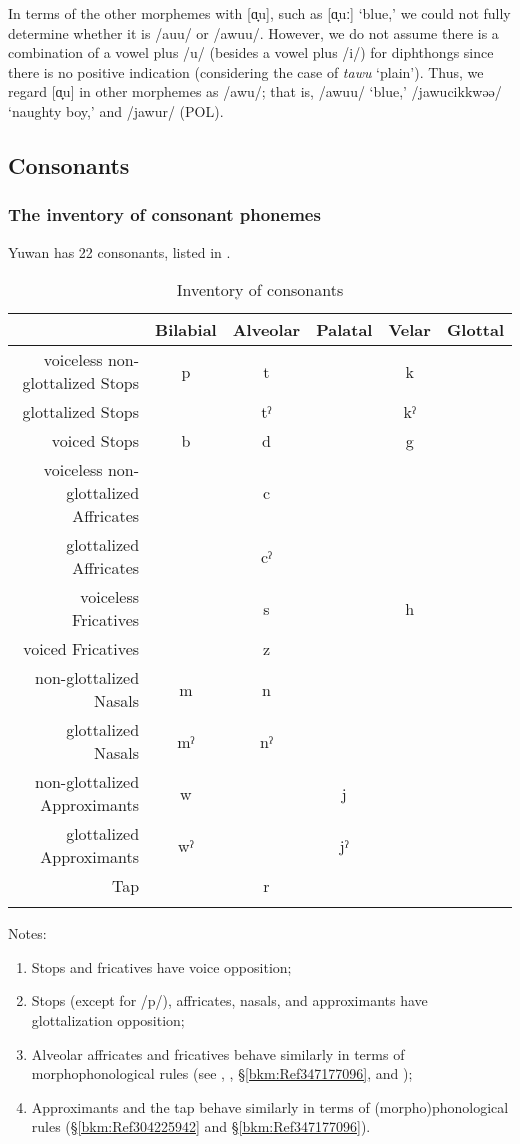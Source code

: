 In terms of the other morphemes with [ɑ̟u], such as [ɑ̟uː] ‘blue,’ we could not fully determine whether it is /auu/ or /awuu/. However, we do not assume there is a combination of a vowel plus /u/ (besides a vowel plus /i/) for diphthongs since there is no positive indication (considering the case of \textit{tawu} ‘plain’). Thus, we regard [ɑ̟u] in other morphemes as /awu/; that is, /awuu/ ‘blue,’ /jawucikkwəə/ ‘naughty boy,’ and /jawur/ (POL).

\subsection{Consonants}
\subsubsection{The inventory of consonant phonemes}

Yuwan has 22 consonants, listed in .

\begin{table}
\caption{Inventory of consonants\label{tab:2:8}}
\begin{tabular}{rccccc}
\lsptoprule
     & Bilabial &  Alveolar &  Palatal &  Velar & Glottal\\\midrule
voiceless non-glottalized Stops & p & t  & &  k  \\
glottalized Stops  &  & tˀ & &   kˀ  \\
voiced  Stops  &  b  & d  & &  g  \\
voiceless non-glottalized Affricates &   & c      \\
glottalized Affricates  &  & cˀ      \\
voiceless Fricatives   &   & s  & &     h\\
voiced Fricatives  &   & z      \\
non-glottalized Nasals & m & n      \\
{glottalized Nasals} & mˀ & nˀ      \\
{non-glottalized Approximants} & w  & &  j    \\
{glottalized Approximants} & wˀ & &   jˀ    \\
Tap   & & r      \\
\lspbottomrule
\end{tabular}
\end{table}

Notes:
\begin{enumerate}[label=\alph*.]
\item Stops and fricatives have voice opposition;
\item Stops (except for /p/), affricates, nasals, and approximants have glottalization opposition;
\item Alveolar affricates and fricatives behave similarly in terms of morphophonological rules (see , , §\ref{bkm:Ref347177096}, and );
\item Approximants and the tap behave similarly in terms of (morpho)phonological rules (§\ref{bkm:Ref304225942} and §\ref{bkm:Ref347177096}).
\end{enumerate}

